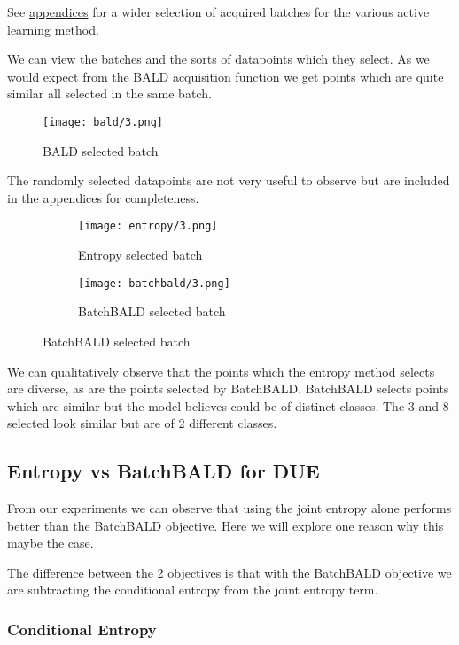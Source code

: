 \documentclass[12pt, a4paper]{report}
\theoremstyle{definition}
\theoremstyle{definition}
\theoremstyle{definition}
\begin{document}
See \hyperref[sec:Batches]{appendices} for a wider selection of acquired batches for the various active learning method.

We can view the batches and the sorts of datapoints which they select. As we would expect from the BALD acquisition function we get points which are quite similar all selected in the same batch.

\begin{figure}[H]
    \centering
    \texttt{[image: bald/3.png]}
    \caption{BALD selected batch}
\end{figure}


The randomly selected datapoints are not very useful to observe but are included in the appendices for completeness.

\begin{figure}[H]
    \centering
    \begin{subfigure}[b]{0.3\textwidth}
        \centering
        \texttt{[image: entropy/3.png]}
        \caption{Entropy selected batch}
    \end{subfigure}
    \hfill
    \begin{subfigure}[b]{0.3\textwidth}
        \centering
        \texttt{[image: batchbald/3.png]}
        \caption{BatchBALD selected batch}
    \end{subfigure}
\end{figure}

We can qualitatively observe that the points which the entropy method selects are diverse, as are the points selected by BatchBALD. BatchBALD selects points which are similar but the model believes could be of distinct classes. The 3 and 8 selected look similar but are of 2 different classes.


\subsection{Entropy vs BatchBALD for DUE}


From our experiments we can observe that using the joint entropy alone performs better than the BatchBALD objective. Here we will explore one reason why this maybe the case.

The difference between the 2 objectives is that with the BatchBALD objective we are subtracting the conditional entropy from the joint entropy term.

\subsubsection{Conditional Entropy}
\end{document}
